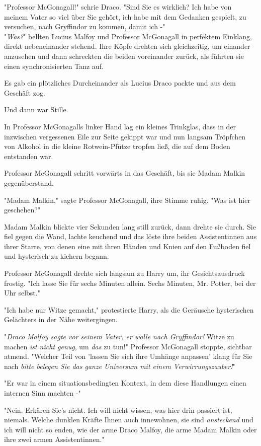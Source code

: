{"Professor McGonagall!" schrie Draco. "Sind Sie es wirklich? Ich habe von meinem Vater so viel über Sie gehört, ich habe mit dem Gedanken gespielt, zu versuchen, nach Gryffindor zu kommen, damit ich -"\\ "\emph{Was?}" bellten Lucius Malfoy und Professor McGonagall in perfektem Einklang, direkt nebeneinander stehend. Ihre Köpfe drehten sich gleichzeitig, um einander anzusehen und dann schreckten die beiden voreinander zurück, als führten sie einen synchronisierten Tanz auf.

Es gab ein plötzliches Durcheinander als Lucius Draco packte und aus dem Geschäft zog.

Und dann war Stille.

In Professor McGonagalls linker Hand lag ein kleines Trinkglas, dass in der inzwischen vergessenen Eile zur Seite gekippt war und nun langsam Tröpfchen von Alkohol in die kleine Rotwein-Pfütze tropfen ließ, die auf dem Boden entstanden war.

Professor McGonagall schritt vorwärts in das Geschäft, bis sie Madam Malkin gegenüberstand.

"Madam Malkin," sagte Professor McGonagall, ihre Stimme ruhig. "Was ist hier geschehen?"

Madam Malkin blickte vier Sekunden lang still zurück, dann drehte sie durch. Sie fiel gegen die Wand, lachte keuchend und das löste ihre beiden Assistentinnen aus ihrer Starre, von denen eine mit ihren Händen und Knien auf den Fußboden fiel und hysterisch zu kichern begann.

Professor McGonagall drehte sich langsam zu Harry um, ihr Gesichtsausdruck frostig. "Ich lasse Sie für sechs Minuten allein. Sechs Minuten, Mr. Potter, bei der Uhr selbst."

"Ich habe nur Witze gemacht," protestierte Harry, als die Geräusche hysterischen Gelächters in der Nähe weitergingen.

"\emph{Draco Malfoy sagte vor seinem Vater, er wolle nach Gryffindor!} Witze zu machen \emph{ist nicht genug}, um \emph{das} zu tun!" Professor McGonagall stoppte, sichtbar atmend. "Welcher Teil von 'lassen Sie sich ihre Umhänge anpassen' klang für Sie nach \emph{bitte belegen Sie das ganze Universum mit einem Verwirrungszauber!}"

"Er war in einem situationsbedingten Kontext, in dem diese Handlungen einen internen Sinn machten -"

"Nein. Erkären Sie's nicht. Ich will nicht wissen, was hier drin passiert ist, niemals. Welche dunklen Kräfte Ihnen auch innewohnen, sie sind \emph{ansteckend} und ich will nicht so enden, wie der arme Draco Malfoy, die arme Madam Malkin oder ihre zwei armen Assistentinnen."

}
